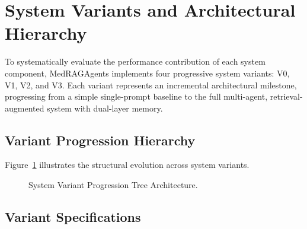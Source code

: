 \section{System Variants and Architectural Hierarchy}
\label{sec:system_variants}

To systematically evaluate the performance contribution of each system component, MedRAGAgents implements four progressive system variants: V0, V1, V2, and V3. Each variant represents an incremental architectural milestone, progressing from a simple single-prompt baseline to the full multi-agent, retrieval-augmented system with dual-layer memory.

\subsection{Variant Progression Hierarchy}

Figure~\ref{fig:variant_tree} illustrates the structural evolution across system variants.

\begin{figure}[htbp]
\centering
{}
\caption{System Variant Progression Tree Architecture.}
\label{fig:variant_tree}
\end{figure}

\subsection{Variant Specifications}

